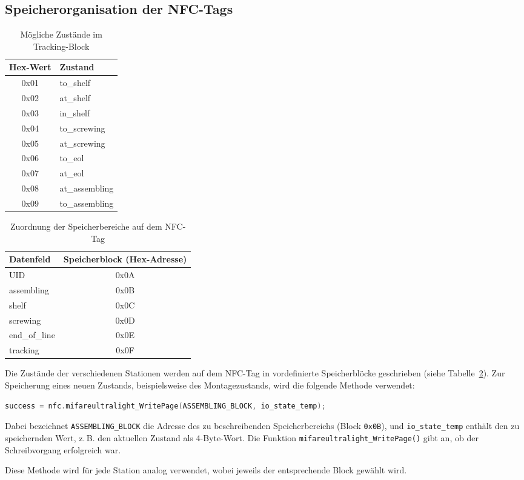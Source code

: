 \subsection{Speicherorganisation der NFC-Tags}

\begin{table}[H]
	\centering
	\caption{Mögliche Zustände im Tracking-Block}
	\label{tab:tracking_states}
	\begin{tabular}{|c|l|}
		\hline
		\textbf{Hex-Wert} & \textbf{Zustand} \\ \hline
		0x01 & to\_shelf \\ \hline
		0x02 & at\_shelf \\ \hline
		0x03 & in\_shelf \\ \hline
		0x04 & to\_screwing \\ \hline
		0x05 & at\_screwing \\ \hline
		0x06 & to\_eol \\ \hline
		0x07 & at\_eol \\ \hline
		0x08 & at\_assembling \\ \hline
		0x09 & to\_assembling \\ \hline
	\end{tabular}
\end{table}


\begin{table}[H]
	\centering
	\caption{Zuordnung der Speicherbereiche auf dem NFC-Tag}
	\label{tab:tag_blocks}
	\begin{tabular}{|l|c|}
		\hline
		\textbf{Datenfeld} & \textbf{Speicherblock (Hex-Adresse)} \\ \hline
		UID & 0x0A \\ \hline
		assembling & 0x0B \\ \hline
		shelf & 0x0C \\ \hline
		screwing & 0x0D \\ \hline
		end\_of\_line & 0x0E \\ \hline
		tracking & 0x0F \\ \hline
	\end{tabular}
\end{table}


Die Zustände der verschiedenen Stationen werden auf dem NFC-Tag in vordefinierte Speicherblöcke geschrieben (siehe Tabelle~\ref{tab:tag_blocks}). Zur Speicherung eines neuen Zustands, beispielsweise des Montagezustands, wird die folgende Methode verwendet:

\begin{lstlisting}[language=C++, caption={Speicherung eines Zustands im Speicherblock \texttt{ASSEMBLING\_BLOCK}}, label={lst:nfc_write}]
	success = nfc.mifareultralight_WritePage(ASSEMBLING_BLOCK, io_state_temp);
\end{lstlisting}

Dabei bezeichnet \texttt{ASSEMBLING\_BLOCK} die Adresse des zu beschreibenden Speicherbereichs (Block \texttt{0x0B}), und \texttt{io\_state\_temp} enthält den zu speichernden Wert, z.\,B. den aktuellen Zustand als 4-Byte-Wort. Die Funktion \texttt{mifareultralight\_WritePage()} gibt an, ob der Schreibvorgang erfolgreich war.

Diese Methode wird für jede Station analog verwendet, wobei jeweils der entsprechende Block gewählt wird.


